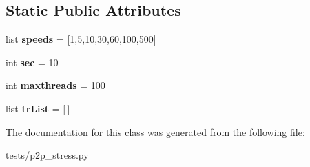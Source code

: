 \subsection*{Static Public Attributes}
\begin{DoxyCompactItemize}
\item 
\mbox{\label{classp2p__stress_1_1_stress_network_a1f8264ddf195d19cbd5fe3d013fa03ee}} 
list {\bfseries speeds} = \mbox{[}1,5,10,30,60,100,500\mbox{]}
\item 
\mbox{\label{classp2p__stress_1_1_stress_network_a258f17b4223ecf15746ca8408a515a73}} 
int {\bfseries sec} = 10
\item 
\mbox{\label{classp2p__stress_1_1_stress_network_aeeebfef58c2a1fbd3f751fc2b1d858d1}} 
int {\bfseries maxthreads} = 100
\item 
\mbox{\label{classp2p__stress_1_1_stress_network_ad4248b2a9f9c19185cf28ee58723b860}} 
list {\bfseries tr\+List} = \mbox{[}$\,$\mbox{]}
\end{DoxyCompactItemize}


The documentation for this class was generated from the following file\+:\begin{DoxyCompactItemize}
\item 
tests/p2p\+\_\+stress.\+py\end{DoxyCompactItemize}
